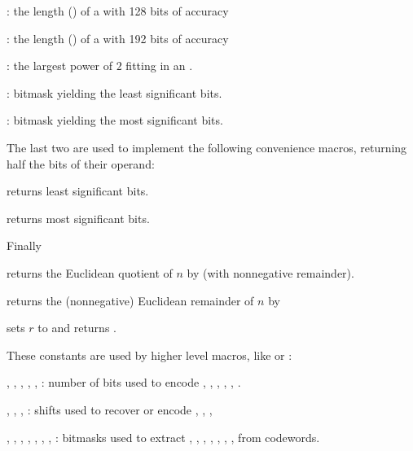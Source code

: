 \noindent {} : the length () of a
 with 128 bits of accuracy

\noindent {} : the length () of a
 with 192 bits of accuracy

\noindent {} : the largest power of $2$ fitting in an
.

\noindent {} : bitmask yielding the least significant
bits.

\noindent {} : bitmask yielding the most significant
bits.

\noindent The last two are used to implement the following convenience macros,
returning half the bits of their operand:

 returns least significant bits.

 returns most significant bits.

\noindent Finally

 returns the Euclidean quotient of $n$ by
 (with nonnegative remainder).

 returns the (nonnegative) Euclidean remainder of $n$
by 


 sets $r$ to 
and returns .


These constants are used by higher level macros, like  or :

\noindent {},
,
,
,
,
:
number of bits used to encode , , ,
, , .

\noindent {},
,
,
: shifts used to recover or encode , ,
, 

\noindent {},
,
,
,
,
,
,
: bitmasks used to extract , , ,
, , , ,  from 
codewords.

